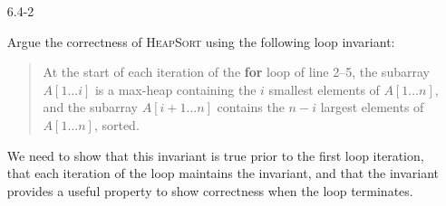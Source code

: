 \begin{enumerate}
\begin{framed}
\begin{center}
\end{center}
\end{framed}

\item[6.4-2]{Argue the correctness of \textsc{HeapSort} using the following loop
invariant:
\begin{quote}
At the start of each iteration of the \textbf{for} loop of line 2{--}5, the
subarray $A[1 \dots i]$ is a max-heap containing the $i$ smallest elements of
$A[1 \dots n]$, and the subarray $A[i + 1 \dots n]$ contains the $n - i$ largest
elements of $A[1 \dots n]$, sorted. \vspace{0.5em}
\end{quote}
}

\begin{framed}
We need to show that this invariant is true prior to the first loop iteration,
that each iteration of the loop maintains the invariant, and that the invariant
provides a useful property to show correctness when the loop terminates.


\end{framed}
\end{enumerate}
